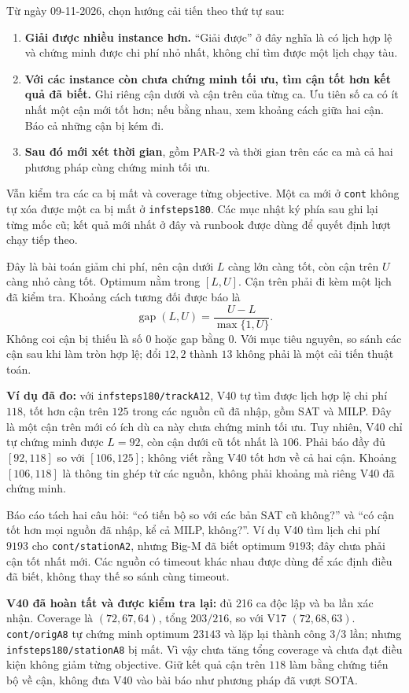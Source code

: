 \documentclass[11pt,a4paper]{article}
\newcommand{\code}[1]{\texttt{#1}}
\begin{document}
Từ ngày 09-11-2026, chọn hướng cải tiến theo thứ tự sau:
\begin{enumerate}
\item \textbf{Giải được nhiều instance hơn.} ``Giải được'' ở đây nghĩa là
      có lịch hợp lệ và chứng minh được chi phí nhỏ nhất, không chỉ tìm
      được một lịch chạy tàu.
\item \textbf{Với các instance còn chưa chứng minh tối ưu, tìm cận tốt
      hơn kết quả đã biết.} Ghi riêng cận dưới và cận trên của từng ca.
      Ưu tiên số ca có ít nhất một cận mới tốt hơn; nếu bằng nhau, xem
      khoảng cách giữa hai cận. Báo cả những cận bị kém đi.
\item \textbf{Sau đó mới xét thời gian}, gồm PAR-2 và thời gian trên các
      ca mà cả hai phương pháp cùng chứng minh tối ưu.
\end{enumerate}
Vẫn kiểm tra các ca bị mất và coverage từng objective. Một ca mới ở
\code{cont} không tự xóa được một ca bị mất ở \code{infsteps180}.
Các mục nhật ký phía sau ghi lại từng mốc cũ; kết quả mới nhất ở đây
và runbook được dùng để quyết định lượt chạy tiếp theo.

Đây là bài toán giảm chi phí, nên cận dưới $L$ càng lớn càng tốt, còn
cận trên $U$ càng nhỏ càng tốt. Optimum nằm trong $[L,U]$. Cận trên phải
đi kèm một lịch đã kiểm tra. Khoảng cách tương đối được báo là
\[
 \operatorname{gap}(L,U)=\frac{U-L}{\max\{1,U\}}.
\]
Không coi cận bị thiếu là số 0 hoặc gap bằng 0. Với mục tiêu nguyên,
so sánh các cận sau khi làm tròn hợp lệ; đổi $12{,}2$ thành $13$ không
phải là một cải tiến thuật toán.

\textbf{Ví dụ đã đo:} với \code{infsteps180/trackA12}, V40 tự tìm được
lịch hợp lệ chi phí $118$, tốt hơn cận trên $125$ trong các nguồn cũ đã
nhập, gồm SAT và MILP. Đây là một cận trên mới có ích dù ca này chưa
chứng minh tối ưu. Tuy nhiên, V40 chỉ tự chứng minh được $L=92$, còn cận
dưới cũ tốt nhất là $106$. Phải báo đầy đủ $[92,118]$ so với $[106,125]$;
không viết rằng V40 tốt hơn về cả hai cận. Khoảng $[106,118]$ là thông tin
ghép từ các nguồn, không phải khoảng mà riêng V40 đã chứng minh.

Báo cáo tách hai câu hỏi: ``có tiến bộ so với các bản SAT cũ không?'' và
``có cận tốt hơn mọi nguồn đã nhập, kể cả MILP, không?''. Ví dụ V40 tìm
lịch chi phí $9193$ cho \code{cont/stationA2}, nhưng Big-M đã biết optimum
$9193$; đây chưa phải cận tốt nhất mới. Các nguồn có timeout khác nhau
được dùng để xác định điều đã biết, không thay thế so sánh cùng timeout.

\textbf{V40 đã hoàn tất và được kiểm tra lại:} đủ 216 ca độc lập và ba
lần xác nhận. Coverage là $(72,67,64)$, tổng $203/216$, so với V17
$(72,68,63)$. \code{cont/origA8} tự chứng minh optimum $23143$ và lặp lại
thành công 3/3 lần; nhưng \code{infsteps180/stationA8} bị mất. Vì vậy chưa
tăng tổng coverage và chưa đạt điều kiện không giảm từng objective.
Giữ kết quả cận trên $118$ làm bằng chứng tiến bộ về cận, không đưa V40
vào bài báo như phương pháp đã vượt SOTA.
\end{document}
